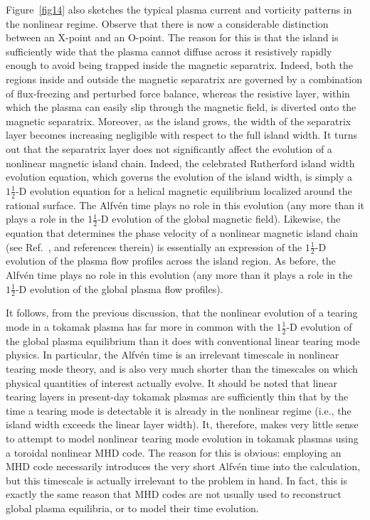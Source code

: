\documentclass[12pt,prb,aps]{revtex4-1}
\begin{document}
Figure~\ref{fig14} also sketches the
typical plasma current and vorticity patterns in the nonlinear regime. Observe that there is now a considerable distinction between an X-point and an O-point. The reason for this is that the island is sufficiently wide that the plasma cannot diffuse across it resistively rapidly enough to
avoid being trapped inside the magnetic separatrix. Indeed, both the regions inside and outside the magnetic separatrix
are governed by a combination of flux-freezing and perturbed force balance, whereas the resistive
layer, within which the plasma can easily slip through the magnetic field,  is diverted onto the magnetic separatrix. Moreover, as
the island grows, the width of the separatrix layer becomes
increasing negligible with respect to the full island width. It
turns out that the separatrix layer does not significantly affect the evolution of a nonlinear magnetic island chain. Indeed,
the celebrated Rutherford island width evolution equation,
which governs the evolution of the island width, is simply a
$1\tfrac{1}{2}$-D evolution equation for a helical magnetic
equilibrium localized around the rational surface.\cite{ruth}
The Alfv\'{e}n time plays no role in this evolution (any more
than it plays a role in the $1\tfrac{1}{2}$-D evolution of
the global magnetic field). Likewise, the equation that
determines the phase velocity of a nonlinear magnetic island chain (see Ref.~, and references therein) is essentially an
expression of the $1\tfrac{1}{2}$-D evolution of the plasma
flow profiles across the island region. As before, the  Alfv\'{e}n time plays no role in this evolution (any more
than it plays a role in the $1\tfrac{1}{2}$-D evolution of
the global plasma flow profiles). 

It follows, from the previous discussion, that the nonlinear evolution of a tearing mode in a tokamak plasma has far more in common with the $1\tfrac{1}{2}$-D
evolution of the global plasma equilibrium than it does with
conventional linear tearing mode physics. In particular, the Alfv\'{e}n time is
an irrelevant timescale in nonlinear tearing mode theory, and
is also  very much shorter than the timescales on which
physical quantities of interest actually evolve. It should be noted that linear tearing layers in present-day tokamak plasmas are sufficiently thin that by the time a tearing mode is detectable it is already in the nonlinear regime (i.e., the island width exceeds the linear layer width).\cite{wesson} It, therefore, makes very little sense to
attempt to model nonlinear tearing mode evolution in tokamak plasmas using a toroidal nonlinear MHD code. The reason for this is obvious: employing  an MHD code necessarily introduces the very short Alfv\'{e}n time into the calculation,
but this timescale is actually irrelevant to the problem in hand. In fact, this is exactly the same reason that MHD codes are not usually used to reconstruct global plasma equilibria, or to model their time evolution.
\end{document}
